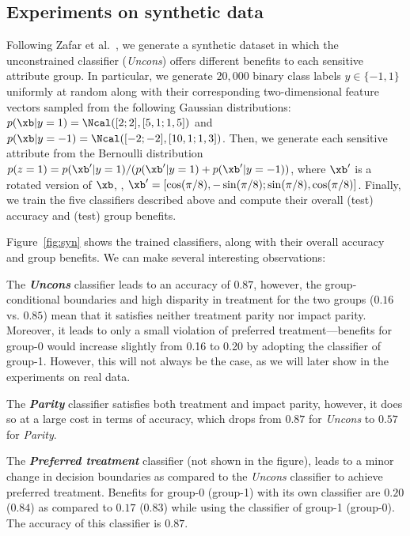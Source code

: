 \documentclass{article}
\newcommand{\xhdr}[1]{\vspace{0mm}\noindent{{\bf #1.}}}
\newcommand{\emphb}[1]{\textbf{\emph{#1}}}
\begin{document}
\subsection{Experiments on synthetic data}
\vspace{-2mm}
\xhdr{Experimental setup} Following Zafar et al.~\cite{zafar_fairness}, we generate a synthetic dataset in which the unconstrained classifier (\emph{Uncons}) offers different benefits to each sensitive attribute group. In particular,
we generate $20{,}000$ binary class labels $y \in \{-1,1 \}$ uniformly at random along with their corresponding two-dimensional feature vectors sampled from the following Gaussian distributions:
$p(\xb | y=1) = \Ncal([2;2], [5,1;1,5])$ and $p(\xb | y=-1) = \Ncal([-2;-2], [10,1;1,3])$.
Then, we generate each sensitive attribute from the Bernoulli distribution $p(z=1)=p(\xb'{} | y=1)/(p(\xb'{} | y=1)+p(\xb'{} | y=-1))$, where $\xb'{}$ is a rotated version
of $\xb$, \ie, $\xb'{} = [\cos(\pi/8), -\sin(\pi/8); \sin(\pi/8),\cos(\pi/8)]$.
Finally, we train the five classifiers described above and compute their overall (test) accuracy and (test) group benefits.

\xhdr{Results}
Figure~\ref{fig:syn} shows the trained classifiers, along with their overall accuracy and group benefits. We can make several interesting observations:

The \emphb{Uncons} classifier leads to an accuracy of $0.87$, however, the group-conditional boundaries and high disparity in
treatment for the two groups ($0.16$ vs. $0.85$) mean that it satisfies neither treatment parity nor impact parity.
Moreover, it leads to only a small violation of preferred treatment---benefits for group-0 would increase slightly from 0.16 to 0.20 by adopting the classifier of group-1. However, this will not always be the
case, as we will later show in the experiments on real data.


The \emphb{Parity} classifier satisfies both treatment and impact parity, however, it does so at a large cost in terms of accuracy, which drops from $0.87$ for \emph{Uncons} to $0.57$
for \emph{Parity}.

The \emphb{Preferred treatment} classifier (not shown in the figure), leads to a minor change in decision boundaries as compared to the \emph{Uncons} classifier to achieve preferred treatment.
Benefits for group-0 (group-1) with its own classifier are $0.20$ ($0.84$) as compared to $0.17$ ($0.83$) while using the classifier of group-1 (group-0).
The accuracy of this classifier is $0.87$.
\end{document}
